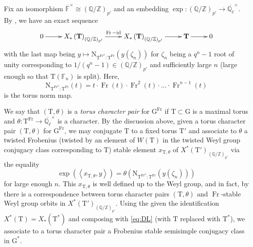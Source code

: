 \documentclass[12pt, reqno]{amsart}
\theoremstyle{definition}
\theoremstyle{definition}
\theoremstyle{definition}
\newcommand{\multiplicativegroup}[1]{#1^{\times}}
\newcommand{\idmap}{\mathrm{id}}
\newcommand{\innerproduct}[2]{\left\langle #1,#2\right\rangle}
\newcommand{\aFieldNorm}{\mathrm{N}}
\newcommand{\finiteField}{\mathbb{F}}
\newcommand{\finiteFieldExtension}[1]{\finiteField_{#1}}
\newcommand{\algebraicClosure}[1]{\overline{#1}}
\newcommand{\Frobenius}{\operatorname{Fr}}
\newcommand{\ladicnumbers}{\algebraicClosure{\mathbb{Q}_{\ell}}}
\newcommand{\algebraicGroup}[1]{\boldsymbol{\mathrm{#1}}}
\newcommand{\CharacterLattice}[1]{X^{\ast}\left(#1\right)}
\newcommand{\CocharacterLattice}[1]{X_{\ast}\left(#1\right)}
\begin{document}
Fix an isomorphism $\multiplicativegroup{\algebraicClosure{\finiteField}} \cong (\mathbb{Q}/\mathbb{Z})_{p'}$ and an embedding $\exp:(\mathbb{Q}/\mathbb{Z})_{p'} \to \overline{\mathbb{Q}_\ell}^\times$. 
By \cite[Proposition 13.7 (ii)]{DigneMichel1991}, we have an exact sequence
\begin{equation}
	\label{eq:DL}
	\xymatrix{0 \ar[r] & \CocharacterLattice{\algebraicGroup{T}}_{(\mathbb{Q}/\mathbb{Z})_{p'}} \ar[r]^{\Frobenius-\idmap} & \CocharacterLattice{\algebraicGroup{T}}_{(\mathbb{Q}/\mathbb{Z})_{p'}} \ar[r] & \algebraicGroup{T} \ar[r] & 0}
\end{equation}
with the last map being $y \mapsto \aFieldNorm_{\algebraicGroup{T}^{\Frobenius^n}:\algebraicGroup{T}^{\Frobenius}}(y(\zeta_n))$
for $\zeta_n$ being a $q^n-1$ root of unity corresponding to $1/(q^n-1) \in (\mathbb{Q}/\mathbb{Z})_{p'}$ and sufficiently large $n$ (large enough so that $\algebraicGroup{T}\left(\finiteFieldExtension{n}\right)$ is split). Here, $$\aFieldNorm_{\algebraicGroup{T}^{\Frobenius^n}:\algebraicGroup{T}^{\Frobenius}}(t) = t\cdot \Frobenius(t)\cdot \Frobenius^2(t)\cdot  \hdots \cdot \Frobenius^{n-1}(t)$$ is the torus norm map.

We say that $(\algebraicGroup{T},\theta)$ is a \emph{torus character pair} for $\algebraicGroup{G}^{\Frobenius}$ if $\algebraicGroup{T} \subset \algebraicGroup{G}$ is a maximal torus and $\theta \colon \algebraicGroup{T}^{\Frobenius} \to \multiplicativegroup{\ladicnumbers}$ is a character. By the discussion above, given a torus character pair  $(\algebraicGroup{T},\theta)$ for $\algebraicGroup{G}^{\Frobenius}$, we may conjugate $\algebraicGroup{T}$ to a fixed torus $\algebraicGroup{T}'$ and associate to $\theta$ a twisted Frobenius (twisted by an element of $W\left(\algebraicGroup{T}\right)$ in the twisted Weyl group conjugacy class corresponding to $\algebraicGroup{T}$) stable element $x_{\algebraicGroup{T},\theta}$ of $\CharacterLattice{\algebraicGroup{T}'}_{(\mathbb{Q}/\mathbb{Z})_{p'}}$ via the equality
\[
\exp(\innerproduct{x_{\algebraicGroup{T},\theta}}{y}) = \theta(\aFieldNorm_{\algebraicGroup{T}^{\Frobenius^n}:\algebraicGroup{T}^{\Frobenius}}(y(\zeta_n)))
\]
for large enough $n$. This $x_{\algebraicGroup{T},\theta}$ is well defined up to the Weyl group, and in fact, by \cite[Corollary 13.9]{DigneMichel1991} there is a correspondence between torus character pairs $(\algebraicGroup{T},\theta)$ and $\Frobenius$-stable Weyl group orbits in $\CharacterLattice{\algebraicGroup{T}'}_{(\mathbb{Q}/\mathbb{Z})_{p'}}$.  Using the given the identification $\CharacterLattice{\algebraicGroup{T}} = \CocharacterLattice{\algebraicGroup{T}^{\ast}}$ and composing with \eqref{eq:DL} (with $\algebraicGroup{T}$ replaced with $\algebraicGroup{T}^{\ast}$), we associate to a torus character pair a Frobenius stable semisimple conjugacy class in $\algebraicGroup{G}^*$.
\end{document}
